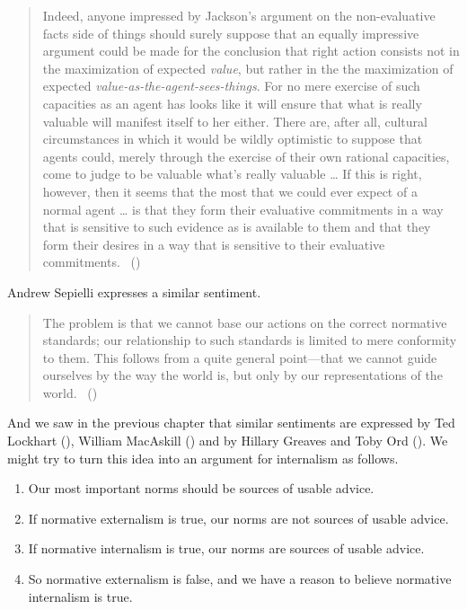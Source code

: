 \documentclass[
  10pt,
  letterpaper,
  twoside]{scrbook}
\providecommand{\tightlist}{%
  \setlength{\itemsep}{0pt}\setlength{\parskip}{0pt}}\usepackage{longtable,booktabs,array}
\begin{document}
\begin{quote}
Indeed, anyone impressed by Jackson's argument on the non-evaluative
facts side of things should surely suppose that an equally impressive
argument could be made for the conclusion that right action consists not
in the maximization of expected \emph{value}, but rather in the the
maximization of expected \emph{value-as-the-agent-sees-things}. For no
mere exercise of such capacities as an agent has looks like it will
ensure that what is really valuable will manifest itself to her either.
There are, after all, cultural circumstances in which it would be wildly
optimistic to suppose that agents could, merely through the exercise of
their own rational capacities, come to judge to be valuable what's
really valuable \ldots{} If this is right, however, then it seems that
the most that we could ever expect of a normal agent \ldots{} is that
they form their evaluative commitments in a way that is sensitive to
such evidence as is available to them and that they form their desires
in a way that is sensitive to their evaluative commitments.
~()
\end{quote}

Andrew Sepielli expresses a similar sentiment.

\begin{quote}
The problem is that we cannot base our actions on the correct normative
standards; our relationship to such standards is limited to mere
conformity to them. This follows from a quite general point---that we
cannot guide ourselves by the way the world is, but only by our
representations of the world. ~()
\end{quote}

And we saw in the previous chapter that similar sentiments are expressed
by Ted Lockhart (), William
MacAskill () and by Hillary
Greaves and Toby Ord (). We might try
to turn this idea into an argument for internalism as follows.

\begin{enumerate}
\def\labelenumi{\arabic{enumi}.}
\tightlist
\item
  Our most important norms should be sources of usable advice.
\item
  If normative externalism is true, our norms are not sources of usable
  advice.
\item
  If normative internalism is true, our norms are sources of usable
  advice.
\item
  So normative externalism is false, and we have a reason to believe
  normative internalism is true.
\end{enumerate}
\end{document}
